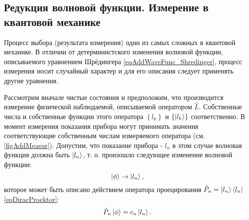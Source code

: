 
\subsection{Редукция волновой функции. Измерение в квантовой механике}
\label{sec:add:reduction}

Процесс выбора (результата измерения) один из самых сложных в
квантовой механике. В отличии от детерминистского изменения волновой
функции, описываемого уравнением Шрёдингера
\eqref{eqAddWaveFunc_Shredinger}, процесс измерения носит случайный
характер и для его описания следует применять другие уравнения. 



Рассмотрим вначале чистые состояния и предположим, что производится
измерение физической наблюдаемой, 
описываемой оператором $\hat{L}$. Собственные числа и собственные
функции этого оператора $\left\{ l_k \right\}$ и 
$\left\{ \ket{l_k} \right\}$ соответственно. В момент
измерения показания прибора могут принимать значения соответствующие
собственным числам измеряемого оператора
(см. \autoref{figAddMeasur}). Допустим, что показание 
прибора - $l_n$ в этом случае волновая функция должна быть 
$\ket{l_n}$, т. о. произошло следующее
изменение волновой функции:
\[
\left| \phi \right> \rightarrow \ket{l_n},
\] 
которое может быть описано действием оператора проецирования 
$\hat{P}_n = \ket{l_n} \bra{l_n}$ \eqref{eqDiracProektor}:
\[
\hat{P}_n \left| \phi \right> = c_n\ket{l_n}.
\]


